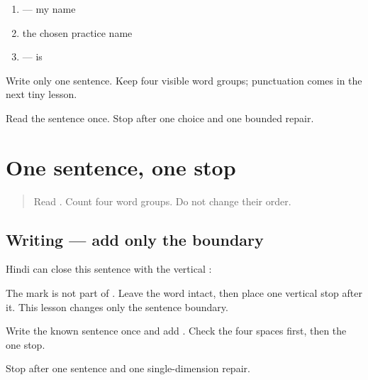 \begin{enumerate}
\raggedright
  \item \textbf{ } — my name
  \item the chosen practice name
  \item \textbf{} — is
\end{enumerate}

Write only one sentence. Keep four visible word groups; punctuation comes in the next tiny lesson.

\begin{tcolorbox}[breakable,colback=teal!4,colframe=teal!35!black,title={Before you move on}]
Read the sentence once. Stop after one choice and one bounded repair.
\end{tcolorbox}
\section[\texorpdfstring{\hi{।} / \hi{पूर्ण} \hi{विराम} (pūrṇa virām)}{। / पूर्ण विराम (pūrṇa virām)}]{One sentence, one stop}

\label{lesson:HI-W06-name-sentence-stop}



\begin{quote}
Read \textbf{   }. Count four word groups. Do not change their order.
\end{quote}

\subsection*{Writing — add only the boundary}
Hindi can close this sentence with the vertical \textbf{ }:

\begin{quote}
\textbf{   }
\end{quote}

The mark \textbf{} is not part of \textbf{}. Leave the word intact, then place one vertical stop after it. This lesson changes only the sentence boundary.

Write the known sentence once and add \textbf{}. Check the four spaces first, then the one stop.

\begin{tcolorbox}[breakable,colback=teal!4,colframe=teal!35!black,title={Before you move on}]
Stop after one sentence and one single-dimension repair.
\end{tcolorbox}
